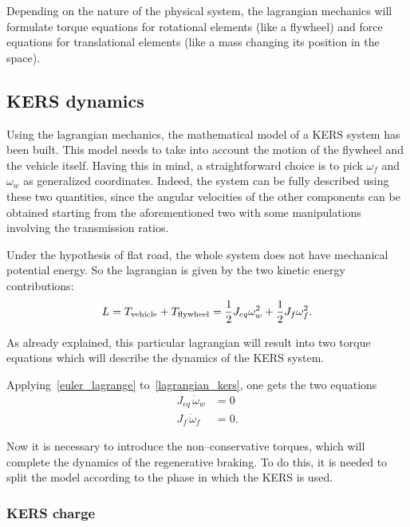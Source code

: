 \documentclass[11pt]{article}
\begin{document}
Depending on the nature of the physical system, the lagrangian mechanics will formulate torque equations for rotational elements (like a flywheel) and force equations for translational elements (like a mass changing its position in the space).

\subsection{KERS dynamics}

Using the lagrangian mechanics, the mathematical model of a KERS system has been built. This model needs to take into account the motion of the flywheel and the vehicle itself. Having this in mind, a straightforward choice is to pick $\omega_f$ and $\omega_w$ as generalized coordinates. Indeed, the system can be fully described using these two quantities, since the angular velocities of the other components can be obtained starting from the aforementioned two with some manipulations involving the transmission ratios. 

Under the hypothesis of flat road, the whole system does not have mechanical potential energy. So the lagrangian is given by the two kinetic energy contributions:
\begin{equation}
L = T_{\textup{vehicle}} + T_{\textup{flywheel}} = \dfrac{1}{2}J_{eq}\omega_w^2 + \dfrac{1}{2}J_f\omega_f^2. 
\label{lagrangian_kers}
\end{equation}

As already explained, this particular lagrangian will result into two torque equations which will describe the dynamics of the KERS system.

Applying~\eqref{euler_lagrange} to~\eqref{lagrangian_kers}, one gets the two equations
\begin{equation}
\begin{split}
J_{eq}\, \dot{\omega}_w & = 0 \\
J_f\, \dot{\omega}_f & = 0.
\end{split}
\label{free_dynamics}
\end{equation}

Now it is necessary to introduce the non--conservative torques, which will complete the dynamics of the regenerative braking. To do this, it is needed to split the model according to the phase in which the KERS is used.

\subsubsection{KERS charge}
\end{document}
